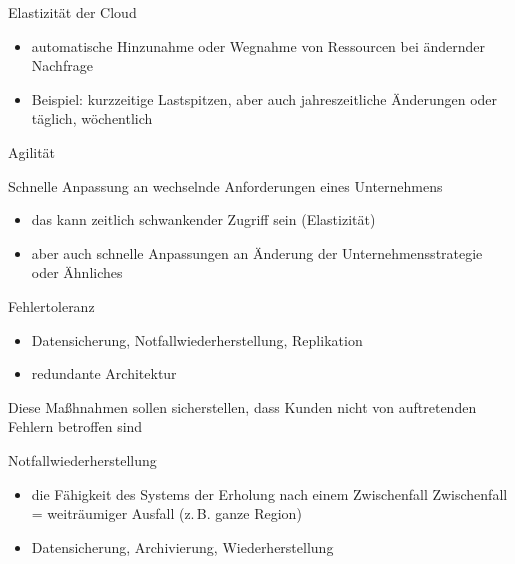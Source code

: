 \begin{flashcard}[Definition]{Elastizität der Cloud}
    \begin{itemize}
        \item automatische Hinzunahme oder Wegnahme von Ressourcen bei ändernder Nachfrage
        \item Beispiel: kurzzeitige Lastspitzen, aber auch jahreszeitliche Änderungen oder täglich, wöchentlich
    \end{itemize}

\end{flashcard}

\begin{flashcard}[Definition]{Agilität}

    \vspace{5mm}
    Schnelle Anpassung an wechselnde Anforderungen eines Unternehmens
    \begin{itemize}
        \item das kann zeitlich schwankender Zugriff sein (Elastizität)
        \item aber auch schnelle Anpassungen an Änderung der Unternehmensstrategie oder Ähnliches
    \end{itemize}

\end{flashcard}

\begin{flashcard}[Definition]{Fehlertoleranz}

    \begin{itemize}
        \item Datensicherung, Notfallwiederherstellung, Replikation
        \item redundante Architektur
    \end{itemize}
    Diese Maßhnahmen sollen sicherstellen, dass Kunden nicht von auftretenden Fehlern betroffen sind
\end{flashcard}

\begin{flashcard}[Definition]{Notfallwiederherstellung}
    \begin{itemize}
        \item die Fähigkeit des Systems der Erholung nach einem Zwischenfall\newline
        Zwischenfall = weiträumiger Ausfall (z.\,B. ganze Region)
        \item Datensicherung, Archivierung, Wiederherstellung
    \end{itemize}

\end{flashcard}

